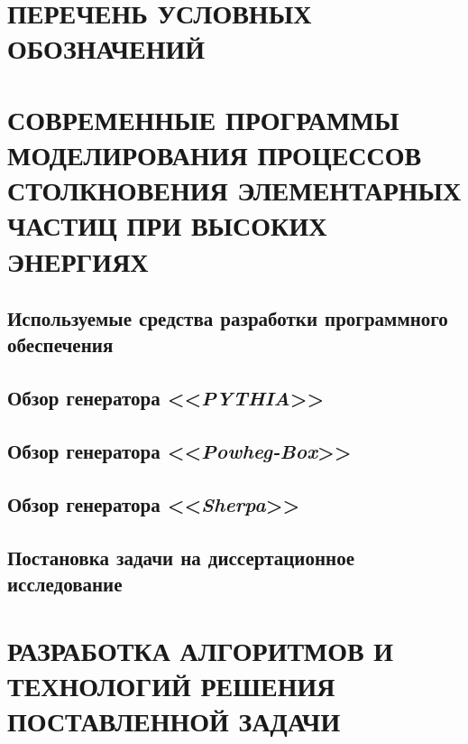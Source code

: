 \documentclass[12pt,a4paper]{styles/report}
\begin{document}
	
\renewcommand\contentsname{ОГЛАВЛЕНИЕ}
\renewcommand{\bibname}{БИБЛИОГРАФИЧЕСКИЙ СПИСОК}
\renewcommand\chaptername{ГЛАВА}
\renewcommand\figurename{Рисунок}
\renewcommand\tablename{Таблица}



\newpage
\pagestyle{plain}  \setcounter{page}{2}
\large \tableofcontents

\newpage
\chapter*{ПЕРЕЧЕНЬ УСЛОВНЫХ ОБОЗНАЧЕНИЙ}






\chapter{СОВРЕМЕННЫЕ ПРОГРАММЫ МОДЕЛИРОВАНИЯ ПРОЦЕССОВ СТОЛКНОВЕНИЯ ЭЛЕМЕНТАРНЫХ ЧАСТИЦ ПРИ ВЫСОКИХ ЭНЕРГИЯХ}

\section{Используемые средства разработки программного обеспечения}


\section{Обзор генератора <<\textit{PYTHIA}>>}

\section{Обзор генератора <<\textit{Powheg-Box}>>}

\section{Обзор генератора <<\textit{Sherpa}>>}

\section{Постановка задачи на диссертационное исследование}

\chapter{РАЗРАБОТКА АЛГОРИТМОВ И ТЕХНОЛОГИЙ РЕШЕНИЯ ПОСТАВЛЕННОЙ ЗАДАЧИ}
\end{document}
